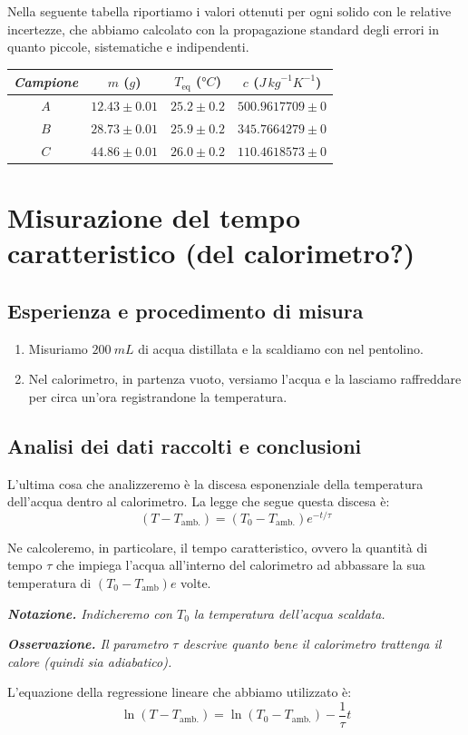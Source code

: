 \documentclass{article}
\begin{document}
Nella seguente tabella riportiamo i valori ottenuti per ogni solido con le relative incertezze, che abbiamo calcolato con la
propagazione standard degli errori in quanto piccole, sistematiche e indipendenti.

\begin{center}
    \begin{tabular}{ |c|c|c|c| }
        \hline
        \emph{Campione} & $m$ ($\unit{g}$) & $T_\text{eq}$ ($\unit{\degree C}$) & $c$ ($\unit{J \, {kg}^{-1} {K}^{-1} }$) \\
        \hline
        $A$ & $12.43 \pm 0.01$ & $25.2 \pm 0.2$ & $500.9617709 \pm 0$ \\
        $B$ & $28.73 \pm 0.01$ & $25.9 \pm 0.2$ & $345.7664279 \pm 0$ \\    %
        $C$ & $44.86 \pm 0.01$ & $26.0 \pm 0.2$ & $110.4618573 \pm 0$ \\
        \hline
    \end{tabular}
\end{center}


\section{Misurazione del tempo caratteristico (del calorimetro?)}

\subsection{Esperienza e procedimento di misura}

\begin{enumerate}
    \item
        Misuriamo $\qty{200}{mL}$ di acqua distillata e la scaldiamo con nel
        pentolino.    %
    \item
        Nel calorimetro, in partenza vuoto, versiamo l'acqua e la lasciamo
        raffreddare per circa un'ora registrandone la temperatura.
\end{enumerate}

\subsection{Analisi dei dati raccolti e conclusioni}
L'ultima cosa che analizzeremo è la discesa esponenziale della temperatura    %
dell'acqua dentro al calorimetro. La legge che segue questa discesa è:
\[
    (T-T_\text{amb.})=(T_0-T_\text{amb.}) e^{-t/\tau}
\]

Ne calcoleremo, in particolare, il tempo caratteristico, ovvero la quantità
di tempo $\tau$ che impiega l'acqua all'interno del calorimetro ad abbassare
la sua temperatura di $(T_0 - T_\text{amb})e$ volte.

\emph{
    \textbf{Notazione.} Indicheremo con $T_0$ la temperatura
    dell'acqua scaldata.
}

\emph{
    \textbf{Osservazione.} Il parametro $\tau$ descrive quanto bene il
    calorimetro trattenga il calore (quindi sia adiabatico).
}

L'equazione della regressione lineare che abbiamo utilizzato è:
\[
    \ln(T-T_\text{amb.})=\ln(T_0-T_\text{amb.})-\frac{1}{\tau}t
\]
\end{document}
